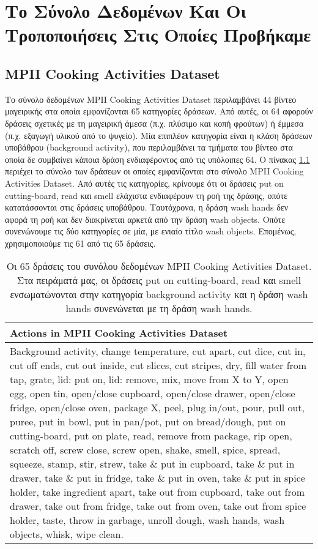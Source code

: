 \chapter{Το Σύνολο Δεδομένων Και Οι Τροποποιήσεις Στις Οποίες Προβήκαμε} \label{dataset}


\section{MPII Cooking Activities Dataset \cite{rohrbach_2012}}
Το σύνολο δεδομένων MPII Cooking Activities Dataset περιλαμβάνει 44 βίντεο μαγειρικής στα οποία εμφανίζονται 65 κατηγορίες δράσεων. Από αυτές, οι 64 αφορούν δράσεις σχετικές με τη μαγειρική άμεσα (π.χ. πλύσιμο και κοπή φρούτων) ή έμμεσα (π.χ. εξαγωγή υλικού από το ψυγείο). Μία επιπλέον κατηγορία είναι η κλάση δράσεων υποβάθρου (background activity), που περιλαμβάνει τα τμήματα του βίντεο στα οποία δε συμβαίνει κάποια δράση ενδιαφέροντος από τις υπόλοιπες 64. Ο πίνακας \ref{tab:DataActions} περιέχει το σύνολο των δράσεων οι οποίες εμφανίζονται στο σύνολο MPII Cooking Activities Dataset. Από αυτές τις κατηγορίες, κρίνουμε ότι οι δράσεις put on cutting-board, read και smell ελάχιστα ενδιαφέρουν τη ροή της δράσης, οπότε κατατάσσονται στις δράσεις υποβάθρου. Ταυτόχρονα, η δράση wash hands δεν αφορά τη ροή και δεν διακρίνεται αρκετά από την δράση wash objects. Οπότε συνενώνουμε τις δύο κατηγορίες σε μία, με ενιαίο τίτλο wash objects. Επομένως, χρησιμοποιούμε τις 61 από τις 65 δράσεις.

\begin{table}
	\begin{tabular}{|p{13.5cm}|}
		\hline
		Actions in MPII Cooking Activities Dataset \\ \hline
		Background activity, change temperature, cut apart, cut dice, cut in, cut off ends, cut out inside, cut slices, cut stripes, dry, fill water from tap, grate, lid: put on, lid: remove, mix, move from X to Y, open egg, open tin, open/close cupboard, open/close drawer, open/close fridge, open/close oven, package X, peel, plug in/out, pour, pull out, puree, put in bowl, put in pan/pot, put on bread/dough, put on cutting-board, put on plate, read, remove from package, rip open, scratch off, screw close, screw open, shake, smell, spice, spread, squeeze, stamp, stir, strew, take \& put in cupboard, take \& put in drawer, take \& put in fridge, take \& put in oven, take \& put in spice holder, take ingredient apart, take out from cupboard, take out from drawer, take out from fridge, take out from oven, take out from spice holder, taste, throw in garbage, unroll dough, wash hands, wash objects, whisk, wipe clean. \\
		\hline
	\end{tabular}
	\caption{Οι 65 δράσεις του συνόλου δεδομένων MPII Cooking Activities Dataset. Στα πειράματά μας, οι δράσεις put on cutting-board, read και smell ενσωματώνονται στην κατηγορία background activity και η δράση wash hands συνενώνεται με τη δράση wash hands.}
	\label{tab:DataActions}
\end{table}



